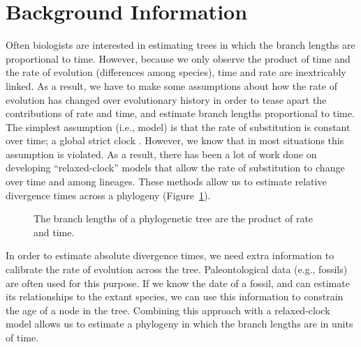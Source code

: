 \documentclass{article}
\begin{document}
\section{Background Information}
Often biologists are interested in estimating trees in which the branch lengths
are proportional to time.
However, because we only observe the product of time and the rate of evolution
(differences among species), time and rate are inextricably linked.
As a result, we have to make some assumptions about how the rate of evolution
has changed over evolutionary history in order to tease apart the contributions
of rate and time, and estimate branch lengths proportional to time.
The simplest assumption (i.e., model) is that the rate of substitution is constant
over time; a global strict clock \citep{Zuckerkandl1962}.
However, we know that in most situations this assumption is violated.
As a result, there has been a lot of work done on developing ``relaxed-clock''
models that allow the rate of substitution to change over time and among
lineages.
These methods allow us to estimate relative divergence times across a phylogeny
(Figure~\ref{fig:branchLengths}).

    \begin{figure}[htbp]
        \centering
        \caption{The branch lengths of a phylogenetic tree are the product of rate and time.}
        \label{fig:branchLengths}
    \end{figure}

In order to estimate absolute divergence times, we need extra information to
calibrate the rate of evolution across the tree.
Paleontological data (e.g., fossils) are often used for this purpose.
If we know the date of a fossil, and can estimate its relationships to the
extant species, we can use this information to constrain the age of a node
in the tree.
Combining this approach with a relaxed-clock model allows us to estimate
a phylogeny in which the branch lengths are in units of time.
\end{document}
